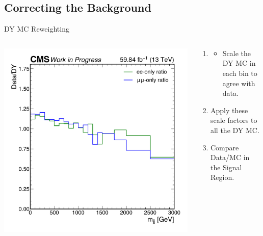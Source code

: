 \documentclass[aspectratio=169]{beamer}
\begin{document}
\subsection{Correcting the Background}

\begin{frame}{DY MC Reweighting}
  \begin{columns}
    \begin{column}{0.50\textwidth}
      \centering
      \includegraphics[width=\textwidth]{../figures/plots/mass_sf_ratio.pdf}
    \end{column}
    \begin{column}{0.50\textwidth}
        \centering
        \resizebox{0.55\columnwidth}{!}{%
        
        }
        \vfill
      \begin{block}{}
        \begin{enumerate}
          \item {}
          \begin{itemize}
            \item Scale the DY MC in each bin to agree with data. 
          \end{itemize}
          \item Apply these scale factors to all the DY MC.
          \item Compare Data/MC in the Signal Region.
        \end{enumerate}
        
      \end{block}
    \end{column}
  \end{columns}
\end{frame}
\end{document}
